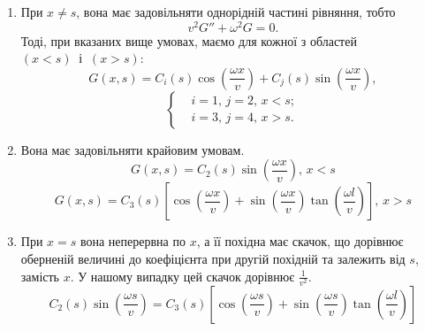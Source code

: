 \begin{enumerate} 
  \item При $x \neq s$, вона має задовільняти однорідній частині рівняння, тобто 
  \begin{equation*}
    v^2 G'' + \omega^2G = 0.    
  \end{equation*}
  Тоді, при вказаних вище умовах, маємо для кожної з областей $(x<s) \;\;\text{і} \;\;(x>s)$:
  \begin{equation*}
    G(x,s) = C_i(s) \cos\left(\frac{\omega x}{v}\right) + C_j(s) \sin\left(\frac{\omega x}{v}\right),    
  \end{equation*}
  \begin{equation*} 
    \left\{ \begin{aligned}
            & i=1,\, j=2,\, x<s;\\
            & i=3,\, j=4,\, x>s.
    \end{aligned} \right.
\end{equation*}

  \item Вона має задовільняти крайовим умовам.
  \begin{equation*}
    G(x,s) = C_2(s) \sin\left(\frac{\omega x}{v}\right), \, x<s 
  \end{equation*}
  \begin{equation*}
    G(x,s) = C_3(s) \left[\cos\left(\frac{\omega x}{v}\right) + \sin\left(\frac{\omega x}{v}\right) \tan\left(\frac{\omega l}{v}\right)\right], \, x>s 
  \end{equation*}
  
  \item При $x=s$ вона неперервна по $x$, а її похідна має скачок, що дорівнює оберненій величині до коефіцієнта при другій похідній та залежить від $s$, замість $x$. У нашому випадку цей скачок дорівнює $\frac{1}{v^2}$.
  \begin{equation*}
    C_2(s) \sin\left(\frac{\omega s}{v}\right) = C_3(s) \left[\cos\left(\frac{\omega s}{v}\right) + \sin\left(\frac{\omega s}{v}\right) \tan\left(\frac{\omega l}{v}\right)\right] 
  \end{equation*}


\end{enumerate}
